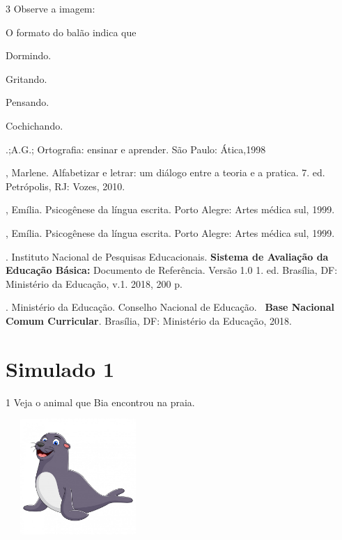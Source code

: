\num{3} Observe a imagem:


O formato do balão indica que

\begin{escolha}
\item Dormindo.

\item Gritando.

\item Pensando.

\item Cochichando.
\end{escolha}


\begin{bibliohedra}
.;A.G.; Ortografia: ensinar e aprender. São Paulo: Ática,1998

, Marlene. Alfabetizar e letrar: um diálogo entre a teoria e a
pratica. 7. ed. Petrópolis, RJ: Vozes, 2010.

, Emília. Psicogênese da língua escrita. Porto Alegre: Artes
médica sul, 1999.

, Emília. Psicogênese da língua escrita. Porto Alegre: Artes
médica sul, 1999.

. Instituto Nacional de Pesquisas Educacionais. \textbf{Sistema de
Avaliação da Educação Básica:} Documento de Referência. Versão 1.0 1.
ed. Brasília, DF: Ministério da Educação, v.1. 2018, 200 p.

. Ministério da Educação. Conselho Nacional de Educação.~
\textbf{Base Nacional Comum Curricular}. Brasília, DF: Ministério da
Educação, 2018.
\end{bibliohedra}

\chapter{Simulado 1}

\num{1} Veja o animal que Bia encontrou na praia.

\includegraphics[width=2.16528in,height=1.72778in]{media/image139.jpeg}

